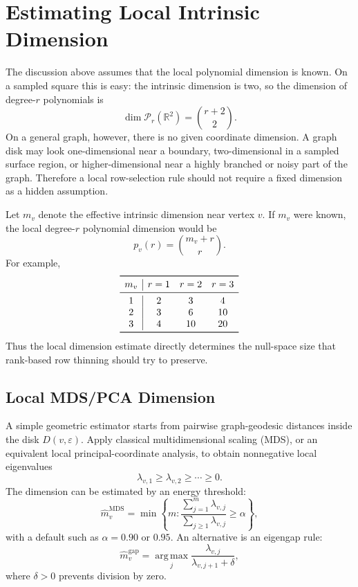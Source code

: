 \documentclass[11pt]{article}
\newcommand{\R}{\mathbb R}
\newcommand{\argmax}{\operatorname*{arg\,max}}
\newcommand{\eps}{\varepsilon}
\begin{document}
\section{Estimating Local Intrinsic Dimension}

The discussion above assumes that the local polynomial dimension is known.  On
a sampled square this is easy: the intrinsic dimension is two, so the dimension
of degree-\(r\) polynomials is
\[
  \dim \mathcal P_r(\R^2)
  =
  \binom{r+2}{2}.
\]
On a general graph, however, there is no given coordinate dimension.  A graph
disk may look one-dimensional near a boundary, two-dimensional in a sampled
surface region, or higher-dimensional near a highly branched or noisy part of
the graph.  Therefore a local row-selection rule should not require a fixed
dimension as a hidden assumption.

Let \(m_v\) denote the effective intrinsic dimension near vertex \(v\).  If
\(m_v\) were known, the local degree-\(r\) polynomial dimension would be
\[
  p_v(r)
  =
  \binom{m_v+r}{r}.
\]
For example,
\[
\begin{array}{c|ccc}
\toprule
m_v & r=1 & r=2 & r=3\\
\midrule
1 & 2 & 3 & 4\\
2 & 3 & 6 & 10\\
3 & 4 & 10 & 20\\
\bottomrule
\end{array}
\]
Thus the local dimension estimate directly determines the null-space size that
rank-based row thinning should try to preserve.

\subsection{Local MDS/PCA Dimension}

A simple geometric estimator starts from pairwise graph-geodesic distances
inside the disk \(D(v,\eps)\).  Apply classical multidimensional scaling
(MDS), or an equivalent local principal-coordinate analysis, to obtain
nonnegative local eigenvalues
\[
  \lambda_{v,1}\ge \lambda_{v,2}\ge \cdots \ge 0.
\]
The dimension can be estimated by an energy threshold:
\[
  \widehat m_v^{\mathrm{MDS}}
  =
  \min\left\{
  m:
  \frac{\sum_{j=1}^m \lambda_{v,j}}
       {\sum_{j\ge 1}\lambda_{v,j}}
  \ge \alpha
  \right\},
\]
with a default such as \(\alpha=0.90\) or \(0.95\).  An alternative is an
eigengap rule:
\[
  \widehat m_v^{\mathrm{gap}}
  =
  \argmax_j
  \frac{\lambda_{v,j}}{\lambda_{v,j+1}+\delta},
\]
where \(\delta>0\) prevents division by zero.
\end{document}
